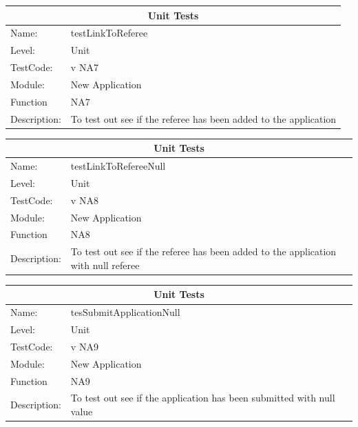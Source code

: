 \documentclass[12pt]{article}
\begin{document}
\begin{center}
\begin{tabular}{|l|p{12cm}|}
\hline
\multicolumn{2}{|c|}{\bf Unit Tests} \\
\hline
 Name: & testLinkToReferee  \\
\hline
Level: & Unit \\
\hline
TestCode: & v NA7 \\
\hline
Module:& New Application\\
\hline
Function & NA7 \\
\hline
Description: & To test out see if the referee has been added to the application  \\
\hline

\end{tabular}
\end{center}

\begin{center}
\begin{tabular}{|l|p{12cm}|}
\hline
\multicolumn{2}{|c|}{\bf Unit Tests} \\
\hline
 Name: & testLinkToRefereeNull  \\
\hline
Level: & Unit \\
\hline
TestCode: & v NA8 \\
\hline
Module:& New Application\\
\hline
Function & NA8 \\
\hline
Description: & To test out see if the referee has been added to the application with null referee  \\
\hline

\end{tabular}
\end{center}

\begin{center}
\begin{tabular}{|l|p{12cm}|}
\hline
\multicolumn{2}{|c|}{\bf Unit Tests} \\
\hline
 Name: & tesSubmitApplicationNull  \\
\hline
Level: & Unit \\
\hline
TestCode: & v NA9 \\
\hline
Module:& New Application\\
\hline
Function & NA9 \\
\hline
Description: & To test out see if the application has been submitted with null value  \\
\hline

\end{tabular}
\end{center}
\end{document}
